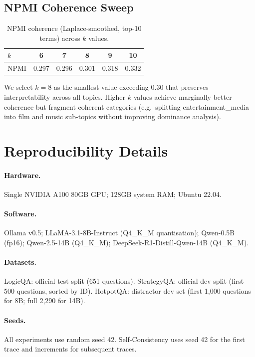 \documentclass{article}
\begin{document}
\subsection{NPMI Coherence Sweep}

\begin{table}[h]
\centering
\caption{NPMI coherence (Laplace-smoothed, top-10 terms) across $k$ values.}
\label{tab:npmi_sweep}
\small
\begin{tabular}{@{}lccccc@{}}
\toprule
$k$ & 6 & 7 & 8 & 9 & 10 \\
\midrule
NPMI & 0.297 & 0.296 & 0.301 & 0.318 & 0.332 \\
\bottomrule
\end{tabular}
\end{table}

We select $k{=}8$ as the smallest value exceeding 0.30 that preserves
interpretability across all topics.  Higher $k$ values achieve marginally
better coherence but fragment coherent categories (e.g.\ splitting
entertainment\_media into film and music sub-topics without improving
dominance analysis).

\section{Reproducibility Details}
\label{app:reproducibility}

\paragraph{Hardware.}
Single NVIDIA A100 80GB GPU; 128GB system RAM; Ubuntu 22.04.

\paragraph{Software.}
Ollama v0.5; LLaMA-3.1-8B-Instruct (Q4\_K\_M quantisation); Qwen-0.5B
(fp16); Qwen-2.5-14B (Q4\_K\_M); DeepSeek-R1-Distill-Qwen-14B (Q4\_K\_M).

\paragraph{Datasets.}
LogicQA: official test split (651 questions).  StrategyQA: official dev split
(first 500 questions, sorted by ID).  HotpotQA: distractor dev set (first
1,000 questions for 8B; full 2,290 for 14B).

\paragraph{Seeds.}
All experiments use random seed 42.  Self-Consistency uses seed 42 for the
first trace and increments for subsequent traces.
\end{document}
